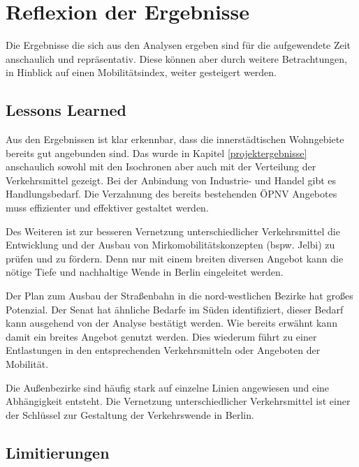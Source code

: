 \newpage
\section{Reflexion der Ergebnisse} \label{fazit}
Die Ergebnisse die sich aus den Analysen ergeben sind für die aufgewendete Zeit anschaulich und repräsentativ. Diese können aber durch weitere Betrachtungen, in Hinblick auf einen Mobilitätsindex, weiter gesteigert werden.

\subsection{Lessons Learned}
Aus den Ergebnissen ist klar erkennbar, dass die innerstädtischen Wohngebiete bereits gut angebunden sind. Das wurde in Kapitel \ref{projektergebnisse} anschaulich sowohl mit den Isochronen aber auch mit der Verteilung der Verkehrsmittel gezeigt. 
Bei der Anbindung von Industrie- und Handel gibt es Handlungsbedarf. Die Verzahnung des bereits bestehenden ÖPNV Angebotes muss effizienter und effektiver gestaltet werden.

Des Weiteren ist zur besseren Vernetzung unterschiedlicher Verkehrsmittel die Entwicklung und der Ausbau von Mirkomobilitätskonzepten (bspw. Jelbi) zu prüfen und zu fördern.
Denn nur mit einem breiten diversen Angebot kann die nötige Tiefe und nachhaltige Wende in Berlin eingeleitet werden.​​

Der Plan zum Ausbau der Straßenbahn in die nord-westlichen Bezirke hat großes Potenzial. Der Senat hat ähnliche Bedarfe im Süden identifiziert, dieser Bedarf kann ausgehend von der Analyse bestätigt werden.
Wie bereits erwähnt kann damit ein breites Angebot genutzt werden. Dies wiederum führt zu einer Entlastungen in den entsprechenden Verkehrsmitteln oder Angeboten der Mobilität.

Die Außenbezirke sind häufig stark auf einzelne Linien angewiesen und eine Abhängigkeit entsteht. Die Vernetzung unterschiedlicher Verkehrsmittel ist einer der Schlüssel zur Gestaltung der Verkehrswende in Berlin. ​


\subsection{Limitierungen}
